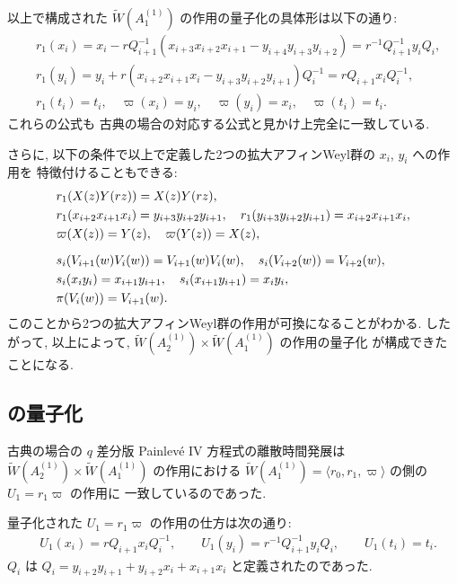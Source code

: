 \documentclass[12pt,twoside,dvipdfm]{msjproc}
\theoremstyle{definition} %
\theoremstyle{definition} %
\theoremstyle{definition} %
\numberwithin{theorem}{section}
\numberwithin{equation}{section}
\numberwithin{figure}{section}
\numberwithin{table}{section}
\newcommand\qP[1]{{\text{$q\mathrm{P}_{\text{#1}}$}}}
\newcommand\bra{\langle}
\newcommand\ket{\rangle}
\newcommand\WW{\widetilde{W}}
\begin{document}
以上で構成された $\WW(A^{(1)}_1)$ の作用の量子化の具体形は以下の通り:
\begin{align*}
 &
 r_1(x_i) 
 = x_i - r Q_{i+1}^{-1}(x_{i+3}x_{i+2}x_{i+1}-y_{i+4}y_{i+3}y_{i+2})
 = r^{-1} Q_{i+1}^{-1}y_i Q_i,
 \\ &
 r_1(y_i)
 = y_i + r(x_{i+2}x_{i+1}x_i-y_{i+3}y_{i+2}y_{i+1})Q_i^{-1}
 = r Q_{i+1} x_i Q_i^{-1},
 \\ &
 r_1(t_i) = t_i,  \quad
 \varpi(x_i)=y_i,   \quad
 \varpi(y_i)=x_i,   \quad
 \varpi(t_i)=t_i.
\end{align*}
これらの公式も
古典の場合の対応する公式と見かけ上完全に一致している.

さらに, 以下の条件で以上で定義した2つの拡大アフィンWeyl群の $x_i$, $y_i$ への作用を
特徴付けることもできる:
\begin{align*}
 &
 r_1(X(z)Y(rz)) = X(z)Y(rz), 
 \\ &
 r_1(x_{i+2}x_{i+1}x_i) = y_{i+3}y_{i+2}y_{i+1}, \quad
 r_1(y_{i+3}y_{i+2}y_{i+1}) = x_{i+2}x_{i+1}x_i,
 \\ &
 \varpi(X(z)) = Y(z), \quad
 \varpi(Y(z)) = X(z),
 \\[\medskipamount] &
 s_i(V_{i+1}(w)V_i(w)) = V_{i+1}(w)V_i(w), \quad
 s_i(V_{i+2}(w))=V_{i+2}(w),
 \\ &
 s_i(x_i y_i) = x_{i+1}y_{i+1}, \quad 
 s_i(x_{i+1}y_{i+1})= x_i y_i,
 \\ &
 \pi(V_i(w)) = V_{i+1}(w).
\end{align*}
このことから2つの拡大アフィンWeyl群の作用が可換になることがわかる.
したがって, 以上によって, $\WW(A^{(1)}_2)\times\WW(A^{(1)}_1)$ の作用の量子化
が構成できたことになる.




\subsection{\qP{IV} の量子化}
\label{sec:qqPIV}

古典の場合の $q$ 差分版 Painlev\'e IV 方程式の離散時間発展は
$\WW(A^{(1)}_2)\times\WW(A^{(1)}_1)$ の作用における
$\WW(A^{(1)}_1)=\bra r_0,r_1, \varpi\ket$ の側の $U_1=r_1\varpi$ の作用に
一致しているのであった. 

量子化された $U_1=r_1\varpi$ の作用の仕方は次の通り:
\begin{align*}
 &
 U_1(x_i) = r Q_{i+1} x_i Q_i^{-1},
 \qquad
 U_1(y_i) = r^{-1} Q_{i+1}^{-1}y_i Q_i,
 \qquad
 U_1(t_i) = t_i.%
\end{align*}
$Q_i$ は $Q_i=y_{i+2}y_{i+1} + y_{i+2}x_i + x_{i+1}x_i$ と定義されたのであった.
\end{document}
